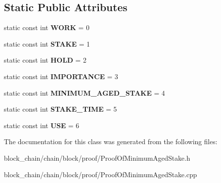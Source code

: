 \subsection*{Static Public Attributes}
\begin{DoxyCompactItemize}
\item 
\mbox{\label{classProof_a457d231986439ee6bcc945daacfc28fc}} 
static const int {\bfseries W\+O\+RK} = 0
\item 
\mbox{\label{classProof_acf157976c3c86ef2fd0e838b8c4ac992}} 
static const int {\bfseries S\+T\+A\+KE} = 1
\item 
\mbox{\label{classProof_ae5c2a86640bf558ff5625157e23b3eec}} 
static const int {\bfseries H\+O\+LD} = 2
\item 
\mbox{\label{classProof_a4e71a5e5928900794353acdd169ca652}} 
static const int {\bfseries I\+M\+P\+O\+R\+T\+A\+N\+CE} = 3
\item 
\mbox{\label{classProof_a1a08ffc465f4fcfde396d4c4feb22eb0}} 
static const int {\bfseries M\+I\+N\+I\+M\+U\+M\+\_\+\+A\+G\+E\+D\+\_\+\+S\+T\+A\+KE} = 4
\item 
\mbox{\label{classProof_a1aa2cb91c5be4ca021714ff6fc01da4a}} 
static const int {\bfseries S\+T\+A\+K\+E\+\_\+\+T\+I\+ME} = 5
\item 
\mbox{\label{classProof_a3f6898fa1d652d32182c3c387c8e979c}} 
static const int {\bfseries U\+SE} = 6
\end{DoxyCompactItemize}


The documentation for this class was generated from the following files\+:\begin{DoxyCompactItemize}
\item 
block\+\_\+chain/chain/block/proof/Proof\+Of\+Minimum\+Aged\+Stake.\+h\item 
block\+\_\+chain/chain/block/proof/Proof\+Of\+Minimum\+Aged\+Stake.\+cpp\end{DoxyCompactItemize}
